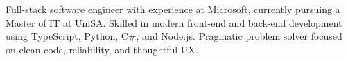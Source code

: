 \vspace{\SectionEntrySpace mm}

\begin{flushleft}
Full-stack software engineer with experience at Microsoft, currently pursuing a Master of IT at UniSA. Skilled in modern front-end and back-end development using TypeScript, Python, C\#, and Node.js. Pragmatic problem solver focused on clean code, reliability, and thoughtful UX.
\end{flushleft}

\vspace{0.1cm}